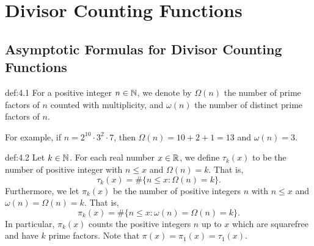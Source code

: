 \section{Divisor Counting Functions}\label{sec:4}

\subsection{Asymptotic Formulas for Divisor Counting Functions}\label{subsec:4.1}

\vspace{2ex}
\begin{defn}{def:4.1}
    For a positive integer $n \in \mathbb{N}$, we denote by $\Omega(n)$ the number 
    of prime factors of $n$ counted with multiplicity, and $\omega(n)$ the 
    number of distinct prime factors of $n$. 
\end{defn}

For example, if $n = 2^{10} \cdot 3^2 \cdot 7$, then $\Omega(n) = 10 + 2 + 1
= 13$ and $\omega(n) = 3$. 

\begin{defn}{def:4.2}
    Let $k \in \mathbb{N}$. For each real number $x \in \mathbb{R}$, we define $\tau_k(x)$ 
    to be the number of positive integer with $n \leq x$ and $\Omega(n) = k$. 
    That is, 
    \[ \tau_k(x) = \#\{n \leq x : \Omega(n) = k\}. \] 
    Furthermore, we let $\pi_k(x)$ be the number of positive integers 
    $n$ with $n \leq x$ and $\omega(n) = \Omega(n) = k$. That is, 
    \[ \pi_k(x) = \#\{n \leq x : \omega(n) = \Omega(n) = k\}. \] 
    In particular, $\pi_k(x)$ counts the positive integers $n$ up to $x$ 
    which are squarefree and have $k$ prime factors. Note that 
    $\pi(x) = \pi_1(x) = \tau_1(x)$. 
\end{defn}

